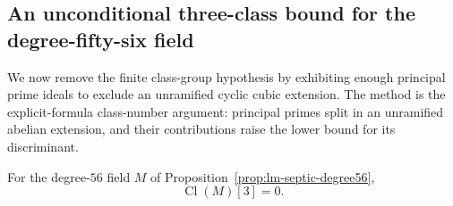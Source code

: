 \subsection{An unconditional three-class bound for the degree-fifty-six field}

We now remove the finite class-group hypothesis by exhibiting enough
principal prime ideals to exclude an unramified cyclic cubic extension.
The method is the explicit-formula class-number argument: principal
primes split in an unramified abelian extension, and their contributions
raise the lower bound for its discriminant.

\begin{proposition}\label{prop:septic-three-class}
For the degree-$56$ field $M$ of
Proposition~\ref{prop:lm-septic-degree56},
\[
 \operatorname{Cl}(M)[3]=0.
\]
\end{proposition}
